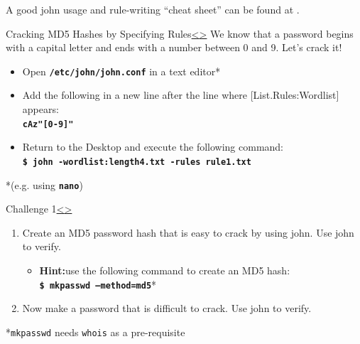 \documentclass[12pt]{extarticle}
\newcommand{\code}[1]{\texttt{\bfseries#1}}
\newenvironment{instructionblock}{\Large\bgroup}{\egroup}
\newcommand{\bi}{\begin{itemize}}
\newcommand{\ei}{\end{itemize}}
\begin{document}
A good john usage and rule-writing ``cheat sheet'' can be found at \cite{cheat}.

\pagebreak
\begin{slide}{Cracking MD5 Hashes by Specifying Rules}{\hyperref[slide 12]{\textless}\hyperref[slide 14]{\textgreater}}
	\begin{instructionblock}
	We know that a password begins with a capital letter and ends with a number between 0 and 9. Let's crack it!
	\begin{itemize}
		\item Open \code{/etc/john/john.conf} in a text editor*
		\item Add the following in a new line after the line where [List.Rules:Wordlist] appears: \\
		\code{cAz"[0-9]"}
		\item Return to the Desktop and execute the following command:\\
			\code{\$ john -wordlist:length4.txt -rules rule1.txt}
		
	\end{itemize}
	\end{instructionblock}
\end{slide}
*(e.g. using \code{nano})



\pagebreak
\begin{slide}{Challenge 1}{\hyperref[slide 13]{\textless}\hyperref[slide 15]{\textgreater}}
\vskip 5pt
\begin{instructionblock}
\begin{enumerate}
\item Create an MD5 password hash that is easy to crack by using john. Use john to verify.
	\bi
		\item\textbf{Hint:}\newline use the following command to create an MD5 hash:\\
			\code{\$ mkpasswd --method=md5}*
	\ei 
	\item Now make a password that is difficult to crack. Use john to verify.
\end{enumerate}
\end{instructionblock}
\end{slide}
*\texttt{mkpasswd} needs \texttt{whois} as a pre-requisite
\end{document}
